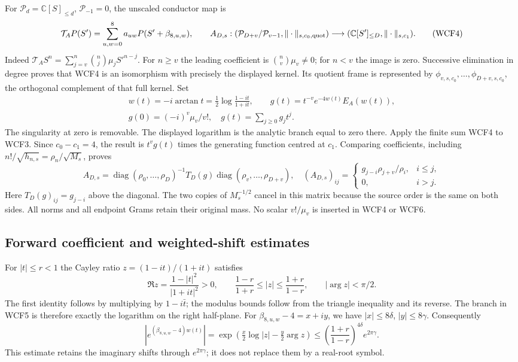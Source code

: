 \documentclass[11pt,a4paper]{article}
\begin{document}
For $\mathcal P_d=\mathbb C[S]_{\le d}$, $\mathcal P_{-1}=0$, the
unscaled conductor map is
\[
 \mathcal T_A P(S')=\sum_{u,w=0}^{8}a_{uw}P(S'+\beta_{8,u,w}),\qquad
 A_{D,s}:(\mathcal P_{D+v}/\mathcal P_{v-1},\|\cdot\|_{s,c_0,\rm quot})
       \longrightarrow(\mathbb C[S']_{\le D},\|\cdot\|_{s,c_1}).
 \tag{WCF4}
\]
Indeed $\mathcal T_A S^n=\sum_{j=v}^n\binom nj\mu_j S'^{n-j}$.
For $n\ge v$ the leading coefficient is $\binom nv\mu_v\ne0$;
for $n<v$ the image is zero. Successive elimination in degree proves
that WCF4 is an isomorphism with precisely the displayed kernel.
Its quotient frame is represented by
$\phi_{v,s,c_0},\ldots,\phi_{D+v,s,c_0}$, the orthogonal complement
of that full kernel. Set
\[
\begin{gathered}
 w(t)=-i\arctan t=\tfrac12\log\frac{1-it}{1+it},\qquad
 g(t)=t^{-v}e^{-4w(t)}E_A(w(t)),\\
 g(0)=(-i)^v\mu_v/v!,\quad g(t)=\sum_{j\ge0}g_jt^j.
\end{gathered}
 \tag{WCF5}
\]
The singularity at zero is removable. The displayed logarithm is the
analytic branch equal to zero there. Apply the finite sum WCF4 to WCF3.
Since $c_0-c_1=4$, the result is $t^vg(t)$ times the generating
function centred at $c_1$. Comparing coefficients, including
$n!/\sqrt{h_{n,s}}=\rho_n/\sqrt{M_s}$, proves
\[
 A_{D,s}=\operatorname{diag}(\rho_0,\ldots,\rho_D)^{-1}
          T_D(g)\operatorname{diag}(\rho_v,\ldots,\rho_{D+v}),
 \quad
 (A_{D,s})_{ij}=\begin{cases}g_{j-i}\rho_{j+v}/\rho_i,&i\le j,\\0,&i>j.
 \end{cases}
 \tag{WCF6}
\]
Here $T_D(g)_{ij}=g_{j-i}$ above the diagonal. The two copies of
$M_s^{-1/2}$ cancel in this matrix because the source order is the same
on both sides. All norms and all endpoint Grams retain their original
mass. No scalar $v!/\mu_v$ is inserted in WCF4 or WCF6.

\subsection{Forward coefficient and weighted-shift estimates}

For $|t|\le r<1$ the Cayley ratio $z=(1-it)/(1+it)$ satisfies
\[
 \Re z=\frac{1-|t|^2}{|1+it|^2}>0,\qquad
 \frac{1-r}{1+r}\le|z|\le\frac{1+r}{1-r},\qquad
 |\arg z|<\pi/2.
 \tag{WCF7}
\]
The first identity follows by multiplying by $1-i\bar t$; the
modulus bounds follow from the triangle inequality and its reverse.
The branch in WCF5 is therefore exactly the logarithm on the right
half-plane. For $\beta_{8,u,w}-4=x+iy$, we have
$|x|\le8\delta$, $|y|\le8\gamma$. Consequently
\[
 \left|e^{(\beta_{8,u,w}-4)w(t)}\right|
 =\exp\!\left(\tfrac{x}{2}\log|z|-\tfrac{y}{2}\arg z\right)
 \le\left(\frac{1+r}{1-r}\right)^{4\delta}e^{2\pi\gamma}.
 \tag{WCF8}
\]
This estimate retains the imaginary shifts through $e^{2\pi\gamma}$;
it does not replace them by a real-root symbol.
\end{document}
